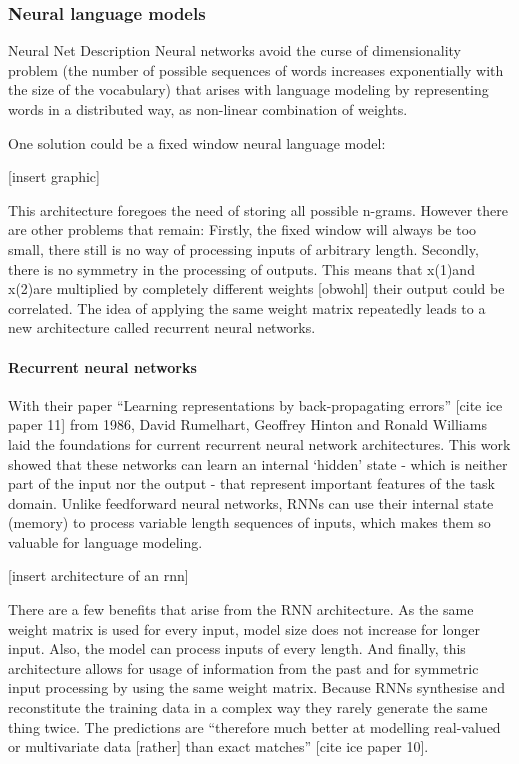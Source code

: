 \subsubsection{Neural language models}
\label{sub:neural_language_models}

Neural Net Description
Neural networks avoid the curse of dimensionality problem (the number of possible sequences of words increases exponentially with the size of the vocabulary) that arises with language modeling by representing words in a distributed way, as non-linear combination of weights.

One solution could be a fixed window neural language model:

[insert graphic]

This architecture foregoes the need of storing all possible n-grams. However there are other problems that remain: Firstly, the fixed window will always be too small, there still is no way of processing inputs of arbitrary length. Secondly, there is no symmetry in the processing of outputs. This means that x(1)and x(2)are multiplied by completely different weights [obwohl] their output could be correlated.
The idea of applying the same weight matrix repeatedly leads to a new architecture called recurrent neural networks.

\paragraph{Recurrent neural networks}
With their paper “Learning representations by back-propagating errors” [cite ice paper 11] from 1986, David Rumelhart, Geoffrey Hinton and Ronald Williams laid the foundations for current recurrent neural network architectures. This work showed that these networks can learn an internal ‘hidden’ state - which is neither part of the input nor the output - that represent important features of the task domain. Unlike feedforward neural networks, RNNs can use their internal state (memory) to process variable length sequences of inputs, which makes them so valuable for language modeling.

[insert architecture of an rnn]

There are a few benefits that arise from the RNN architecture. As the same weight matrix is used for every input, model size does not increase for longer input. Also, the model can process inputs of every length. And finally, this architecture allows for usage of information from the past and for symmetric input processing by using the same weight matrix.
Because RNNs synthesise and reconstitute the training data in a complex way they rarely generate the same thing twice. The predictions are “therefore much better at modelling real-valued or multivariate data [rather] than exact matches” [cite ice paper 10].

